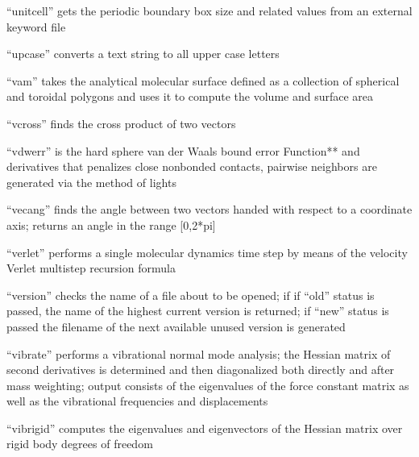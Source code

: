 \documentclass[letterpaper,11pt,english]{sphinxmanual}
\begin{document}

“unitcell” gets the periodic boundary box size and related values from an external keyword file


“upcase” converts a text string to all upper case letters


“vam” takes the analytical molecular surface defined as a collection of spherical and toroidal polygons and uses it to compute the volume and surface area


“vcross” finds the cross product of two vectors


“vdwerr” is the hard sphere van der Waals bound error Function** and derivatives that penalizes close nonbonded contacts, pairwise neighbors are generated via the method of lights


“vecang” finds the angle between two vectors handed with respect to a coordinate axis; returns an angle in the range {[}0,2*pi{]}


“verlet” performs a single molecular dynamics time step by means of the velocity Verlet multistep recursion formula


“version” checks the name of a file about to be opened; if if “old” status is passed, the name of the highest current version is returned; if “new” status is passed the filename of the next available unused version is generated


“vibrate” performs a vibrational normal mode analysis; the Hessian matrix of second derivatives is determined and then diagonalized both directly and after mass weighting; output consists of the eigenvalues of the force constant matrix as well as the vibrational frequencies and displacements


“vibrigid” computes the eigenvalues and eigenvectors of the Hessian matrix over rigid body degrees of freedom
\end{document}
